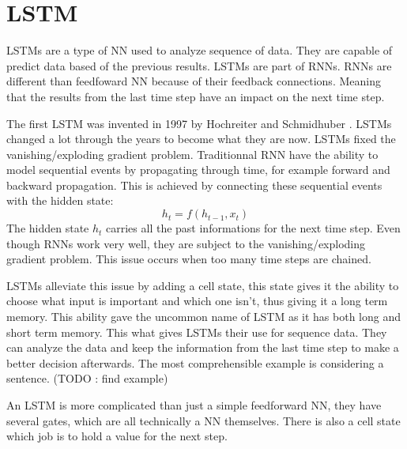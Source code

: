 \section{LSTM}\label{sec:lstm}
\acp{LSTM} are a type of \ac{NN} used to analyze sequence of data. They are capable of predict data based of the previous results. \acp{LSTM} are part of \acp{RNN}. \acp{RNN} are different than feedfoward \acl{NN} because of their feedback connections. Meaning that the results from the last time step have an impact on the next time step.

The first \ac{LSTM} was invented in 1997 by Hochreiter and Schmidhuber \cite{firstLSTM}. \acp{LSTM} changed a lot through the years to become what they are now.
\acp{LSTM} fixed the vanishing/exploding gradient problem. Traditionnal \ac{RNN} have the ability to model sequential events by propagating through time, for example forward and backward propagation. This is achieved by connecting these sequential events with the hidden state:
$$h_t=f(h_{t-1},x_t)$$
The hidden state $h_t$ carries all the past informations for the next time step.
Even though \acp{RNN} work very well, they are subject to the vanishing/exploding gradient problem. This issue occurs when too many time steps are chained.

\acp{LSTM} alleviate this issue by adding a cell state, this state gives it the ability to choose what input is important and which one isn't, thus giving it a long term memory. This ability gave the uncommon name of \acl{LSTM} as it has both long and short term memory. This what gives \acp{LSTM} their use for sequence data. They can analyze the data and keep the information from the last time step to make a better decision afterwards. The most comprehensible example is considering a sentence. (TODO : find example)

An \ac{LSTM} is more complicated than just a simple feedforward \acl{NN}, they have several gates, which are all technically a \ac{NN} themselves. There is also a cell state which job is to hold a value for the next step.

\begin{figure}[H]
  \centering
  \begin{minipage}{\columnwidth}
  \end{minipage}
  \begin{minipage}{\columnwidth}
  \end{minipage}
  \caption{}
\end{figure}

